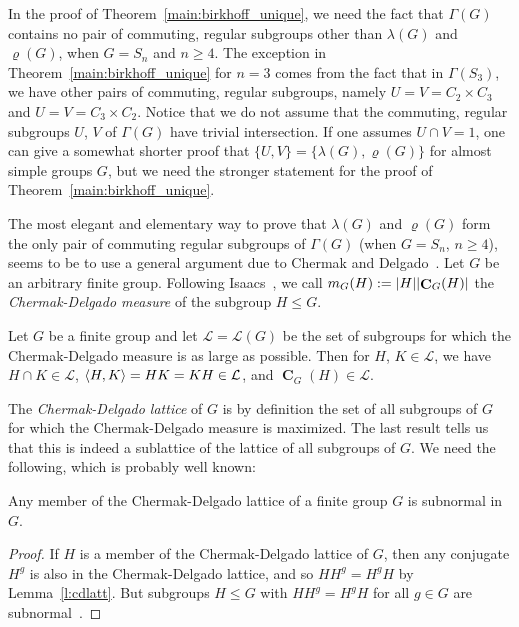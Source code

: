 \documentclass[ALCO,Unicode]{cedram}
\renewcommand{\rho}{\varrho}
\renewcommand{\geq}{\geqslant}
\renewcommand{\leq}{\leqslant}
\DeclarePairedDelimiter{\card}{\lvert}{\rvert}  %
\DeclarePairedDelimiter{\erz}{\langle}{\rangle} %
\DeclareMathOperator{\Centrl}{\mathbf{C}}     %
\begin{document}
In the proof of Theorem~\ref{main:birkhoff_unique}, 
we need the fact
that $\Gamma(G)$ contains no pair of commuting,
regular subgroups other than $\lambda(G)$
and $\rho(G)$, when $G = S_n$ and $n\geq 4$.
The exception in Theorem~\ref{main:birkhoff_unique}
for $n=3$
comes from the fact that 
in $\Gamma(S_3)$, we have other pairs of commuting, regular
subgroups, namely $U=V = C_2 \times C_3$
and $U=V= C_3\times C_2$.
Notice that we do not assume that the commuting, regular subgroups
$U$, $V$
of $\Gamma(G)$ have trivial intersection.
If one assumes $U\cap V=1$, one can give a somewhat 
shorter proof that 
$\{U,V\} = \{ \lambda(G), \rho(G)\}$
for almost simple groups $G$,
but we need the stronger statement for the proof of 
Theorem~\ref{main:birkhoff_unique}.

The most elegant and elementary way to prove 
that $\lambda(G)$ and $\rho(G)$ form the only pair
of commuting regular subgroups of $\Gamma(G)$
(when $G= S_n$, $n\geq 4$),
seems to be to use a general argument due to
Chermak and Delgado~\cite{ChermakDelgado89}.
Let $G$ be an arbitrary finite group.
Following Isaacs~\cite[\S~1G]{IsaacsFGT},
we call $m_G(H) := \card{H}\card{\Centrl_G(H)}$
the \emph{Chermak-Delgado measure} of the subgroup
$H\leq G$.

\begin{lemma}\cite[Theorem~1.44]{IsaacsFGT}
  \label{l:cdlatt}
  Let $G$ be a finite  group and let
  $\mathcal{L} = \mathcal{L}(G)$ be the set of subgroups
  for which the Chermak-Delgado measure is as large as 
  possible.
  Then for $H$, $K\in \mathcal{L}$, we have
  $H\cap K\in \mathcal{L}$,
  $\erz{H,K} =HK=KH \in \mathcal{L}$, 
  and $\Centrl_G(H)\in \mathcal{L}$.
\end{lemma}

The \emph{Chermak-Delgado lattice} of $G$ is by definition
the set of all subgroups of $G$ for which 
the Chermak-Delgado measure is maximized.
The last result tells us that this is indeed a sublattice
of the lattice of all subgroups of $G$.
We need the following, which is probably well known:

\begin{cor}
  Any member of the Chermak-Delgado lattice
  of a finite group $G$ is subnormal in $G$.
\end{cor}

\begin{proof}
If $H$ is a member of the Chermak-Delgado lattice of $G$,
then any conjugate $H^g$ is also in the 
Chermak-Delgado lattice,
and so $HH^g = H^g H$ by Lemma~\ref{l:cdlatt}.
But subgroups $H\leq G$ with $HH^g = H^gH$ for all $g\in G$
are subnormal~\cite[Theorem~2.8]{IsaacsFGT}.
\end{proof}
\end{document}
